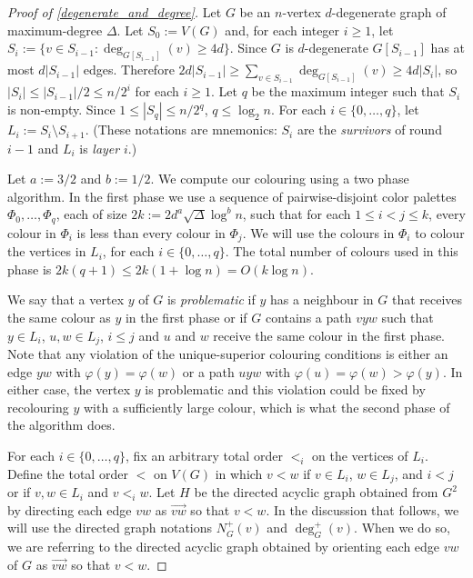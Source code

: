 \documentclass{patmorin}
\newcommand{\defin}[1]{\emph{\color{brightmaroon}#1}}
\begin{document}
\begin{proof}[Proof of \cref{degenerate_and_degree}]
  Let $G$ be an $n$-vertex $d$-degenerate graph of maximum-degree $\Delta$.  Let $S_0:=V(G)$ and, for each integer $i\ge 1$, let $S_i:=\{v\in S_{i-1}:\deg_{G[S_{i-1}]}(v)\ge 4d\}$.  Since $G$ is $d$-degenerate $G[S_{i-1}]$ has at most $d|S_{i-1}|$ edges.  Therefore $2d|S_{i-1}|\ge \sum_{v\in S_{i-1}} \deg_{G[S_{i-1}]}(v)\ge 4d|S_i|$, so $|S_i|\le |S_{i-1}|/2\le n/2^i$ for each $i\ge 1$.  Let $q$ be the maximum integer such that $S_i$ is non-empty.  Since $1\le |S_q|\le n/2^q$, $q\le \log_2 n$.  For each $i\in\{0,\ldots,q\}$, let $L_i:=S_i\setminus S_{i+1}$.  (These notations are mnemonics: $S_i$ are the \defin{survivors} of round $i-1$ and $L_i$ is \defin{layer} $i$.)

  Let $a:=3/2$ and $b:=1/2$.  We compute our colouring using a two phase algorithm. In the first phase we use a sequence of pairwise-disjoint color palettes $\Phi_0,\ldots,\Phi_{q}$, each of size $2k:=2d^{a}\sqrt{\Delta}\log^{b}n$, such that for each $1\le i < j\le k$, every colour in $\Phi_i$ is less than every colour in $\Phi_j$.  We will use the colours in $\Phi_i$ to colour the vertices in $L_i$, for each $i\in\{0,\ldots,q\}$.  The total number of colours used in this phase is $2k(q+1)\le 2k(1+\log n)= O(k\log n)$.

  We say that a vertex $y$ of $G$ is \defin{problematic} if $y$ has a neighbour in $G$ that receives the same colour as $y$ in the first phase or if $G$ contains a path $vyw$ such that $y\in L_i$, $u,w\in L_j$, $i \le j$ and $u$ and $w$ receive the same colour in the first phase. Note that any violation of the unique-superior colouring conditions is either an edge $yw$ with $\varphi(y)=\varphi(w)$ or a path $uyw$ with $\varphi(u)=\varphi(w)>\varphi(y)$.  In either case, the vertex $y$ is problematic and this violation could be fixed by recolouring $y$ with a sufficiently large colour, which is what the second phase of the algorithm does.

  For each $i\in\{0,\ldots,q\}$, fix an arbitrary total order $<_i$ on the vertices of $L_i$. Define the total order $<$ on $V(G)$ in which $v <w$ if $v\in L_i$, $w\in L_j$, and $i<j$ or if $v,w\in L_i$ and $v<_iw$. Let $H$ be the directed acyclic graph obtained from $G^2$ by directing each edge $vw$ as $\overrightarrow{vw}$ so that $v<w$.  In the discussion that follows, we will use the directed graph notations $N^+_G(v)$ and $\deg^+_G(v)$.  When we do so, we are referring to the directed acyclic graph obtained by orienting each edge $vw$ of $G$ as $\overrightarrow{vw}$ so that $v<w$.


\end{proof}
\end{document}
